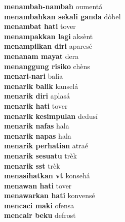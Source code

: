 \textbf{ menambah-nambah  } oumentá \\
\textbf{ menambahkan sekali ganda  } dòbel \\
\textbf{ menambat hati  } tover \\
\textbf{ menampakkan lagi  } aksènt \\
\textbf{ menampilkan diri  } aparesé \\
\textbf{ menanam mayat  } dera \\
\textbf{ menanggung risiko  } chèns \\
\textbf{ menari-nari  } balia \\
\textbf{ menarik balik  } kanselá \\
\textbf{ menarik diri  } aplasá \\
\textbf{ menarik hati  } tover \\
\textbf{ menarik kesimpulan  } dedusí \\
\textbf{ menarik nafas  } hala \\
\textbf{ menarik napas  } hala \\
\textbf{ menarik perhatian  } atraé \\
\textbf{ menarik sesuatu  } trèk \\
\textbf{ menarik sst  } trèk \\
\textbf{ menasihatkan vt  } konsehá \\
\textbf{ menawan hati  } tover \\
\textbf{ menawarkan hati  } konvensé \\
\textbf{ mencaci maki  } ofensa \\
\textbf{ mencair beku  } defrost \\
